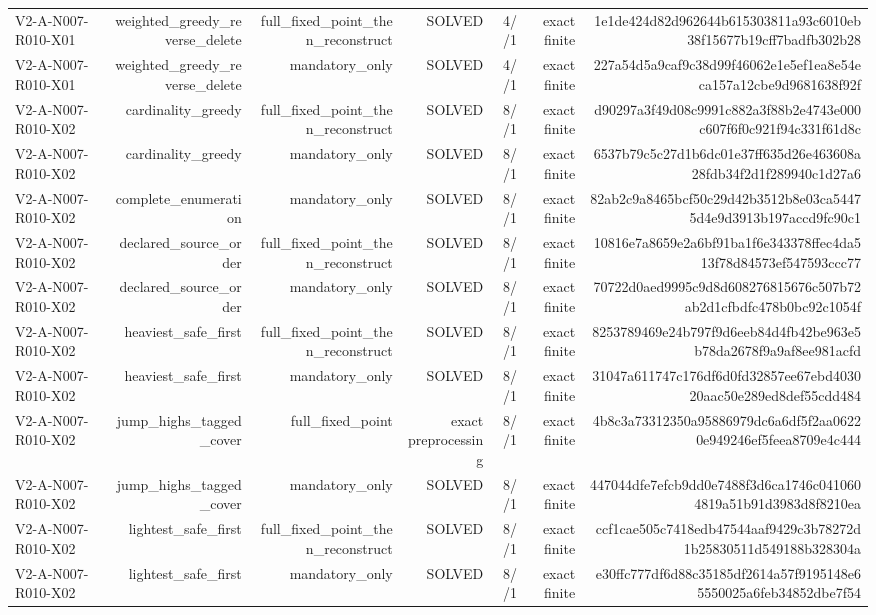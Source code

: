 {\begin{longtable}{lrrrrrr}
V2-A-N007-R010-X01 & weighted\_greedy\_reverse\_delete & full\_fixed\_point\_then\_reconstruct & SOLVED & 4//1 & exact finite & 1e1de424d82d962644b615303811a93c6010eb38f15677b19cff7badfb302b28 \\
V2-A-N007-R010-X01 & weighted\_greedy\_reverse\_delete & mandatory\_only & SOLVED & 4//1 & exact finite & 227a54d5a9caf9c38d99f46062e1e5ef1ea8e54eca157a12cbe9d9681638f92f \\
V2-A-N007-R010-X02 & cardinality\_greedy & full\_fixed\_point\_then\_reconstruct & SOLVED & 8//1 & exact finite & d90297a3f49d08c9991c882a3f88b2e4743e000c607f6f0c921f94c331f61d8c \\
V2-A-N007-R010-X02 & cardinality\_greedy & mandatory\_only & SOLVED & 8//1 & exact finite & 6537b79c5c27d1b6dc01e37ff635d26e463608a28fdb34f2d1f289940c1d27a6 \\
V2-A-N007-R010-X02 & complete\_enumeration & mandatory\_only & SOLVED & 8//1 & exact finite & 82ab2c9a8465bcf50c29d42b3512b8e03ca54475d4e9d3913b197accd9fc90c1 \\
V2-A-N007-R010-X02 & declared\_source\_order & full\_fixed\_point\_then\_reconstruct & SOLVED & 8//1 & exact finite & 10816e7a8659e2a6bf91ba1f6e343378ffec4da513f78d84573ef547593ccc77 \\
V2-A-N007-R010-X02 & declared\_source\_order & mandatory\_only & SOLVED & 8//1 & exact finite & 70722d0aed9995c9d8d608276815676c507b72ab2d1cfbdfc478b0bc92c1054f \\
V2-A-N007-R010-X02 & heaviest\_safe\_first & full\_fixed\_point\_then\_reconstruct & SOLVED & 8//1 & exact finite & 8253789469e24b797f9d6eeb84d4fb42be963e5b78da2678f9a9af8ee981acfd \\
V2-A-N007-R010-X02 & heaviest\_safe\_first & mandatory\_only & SOLVED & 8//1 & exact finite & 31047a611747c176df6d0fd32857ee67ebd403020aac50e289ed8def55cdd484 \\
V2-A-N007-R010-X02 & jump\_highs\_tagged\_cover & full\_fixed\_point & exact preprocessing & 8//1 & exact finite & 4b8c3a73312350a95886979dc6a6df5f2aa06220e949246ef5feea8709e4c444 \\
V2-A-N007-R010-X02 & jump\_highs\_tagged\_cover & mandatory\_only & SOLVED & 8//1 & exact finite & 447044dfe7efcb9dd0e7488f3d6ca1746c0410604819a51b91d3983d8f8210ea \\
V2-A-N007-R010-X02 & lightest\_safe\_first & full\_fixed\_point\_then\_reconstruct & SOLVED & 8//1 & exact finite & ccf1cae505c7418edb47544aaf9429c3b78272d1b25830511d549188b328304a \\
V2-A-N007-R010-X02 & lightest\_safe\_first & mandatory\_only & SOLVED & 8//1 & exact finite & e30ffc777df6d88c35185df2614a57f9195148e65550025a6feb34852dbe7f54 \\

\end{longtable}}
